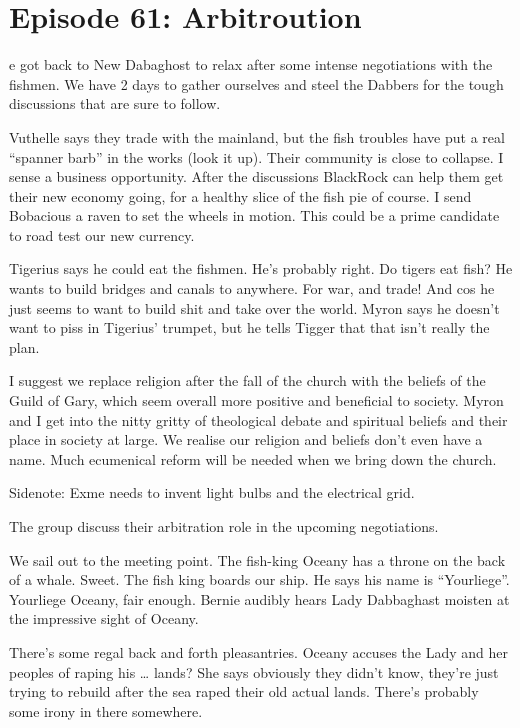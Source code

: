 \section{Episode 61: Arbitroution}

\medskip

e got back to New Dabaghost to relax after some intense negotiations with the fishmen. We have 2 days to gather ourselves and steel the Dabbers for the tough discussions that are sure to follow.\medskip

Vuthelle says they trade with the mainland, but the fish troubles have put a real “spanner barb” in the works (look it up). Their community is close to collapse. I sense a business opportunity. After the discussions BlackRock can help them get their new economy going, for a healthy slice of the fish pie of course. I send Bobacious a raven to set the wheels in motion. This could be a prime candidate to road test our new currency.\medskip

Tigerius says he could eat the fishmen. He’s probably right. Do tigers eat fish? He wants to build bridges and canals to anywhere. For war, and trade! And cos he just seems to want to build shit and take over the world. Myron says he doesn’t want to piss in Tigerius’ trumpet, but he tells Tigger that that isn’t really the plan.\medskip

I suggest we replace religion after the fall of the church with the beliefs of the Guild of Gary, which seem overall more positive and beneficial to society. Myron and I get into the nitty gritty of theological debate and spiritual beliefs and their place in society at large. We realise our religion and beliefs don’t even have a name. Much ecumenical reform will be needed when we bring down the church.\medskip

Sidenote: Exme needs to invent light bulbs and the electrical grid.\medskip

The group discuss their arbitration role in the upcoming negotiations.\medskip

We sail out to the meeting point. The fish-king Oceany has a throne on the back of a whale. Sweet. The fish king boards our ship. He says his name is “Yourliege”. Yourliege Oceany, fair enough. Bernie audibly hears Lady Dabbaghast moisten at the impressive sight of Oceany.\medskip

There’s some regal back and forth pleasantries. Oceany accuses the Lady and her peoples of raping his … lands? She says obviously they didn’t know, they’re just trying to rebuild after the sea raped their old actual lands. There’s probably some irony in there somewhere.\medskip

